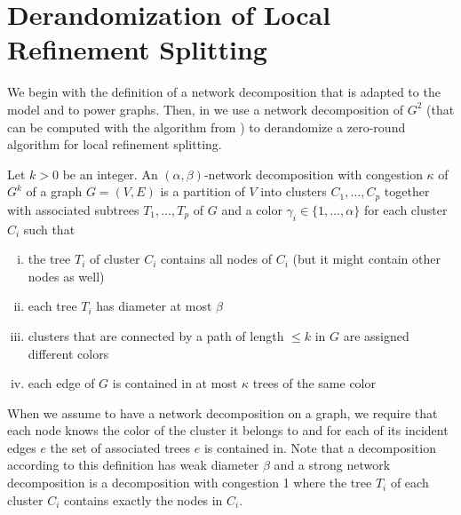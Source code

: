 \section{Derandomization of Local Refinement Splitting}
\label{app:localRefinementSplitting}
We begin with the definition of a network decomposition that is adapted to the {\congest} model and to power graphs. Then, in  we use a network decomposition of $G^2$ (that can be computed with the algorithm from \cite{RG19}) to derandomize a zero-round algorithm for local refinement splitting.

\label{ssec:networkDecomp}
\begin{definition}
\label{def:nd} Let $k>0$ be an integer. 
An $(\alpha,\beta)$-network decomposition with congestion $\kappa$ of $G^k$ of a graph $G=(V,E)$ is a partition of $V$ into clusters $C_1,\dots,C_p$ together with associated subtrees $T_1,\ldots,T_p$ of $G$ and a color $\gamma_i\in\{1,\dots,\alpha\}$ for each cluster $C_i$ such that
\begin{enumerate}[(i)]
\item the tree $T_i$ of cluster $C_i$ contains all nodes of $C_i$ (but it might contain other nodes as well)
\item each tree $T_i$ has diameter at most $\beta$
\item clusters that are connected by a path of length $\leq k$ in $G$ are assigned different colors
\item each edge of $G$ is contained in at most $\kappa$ trees of the same color
\end{enumerate}
\end{definition}

When we assume to have a network decomposition on a graph, we require that each node knows the color of the cluster it belongs to and for each of its incident edges $e$ the set of associated trees $e$ is contained in. Note that a decomposition according to this definition has weak diameter $\beta$ and a strong network decomposition is a decomposition with congestion 1 where the tree $T_i$ of each cluster $C_i$ contains exactly the nodes in $C_i$.

